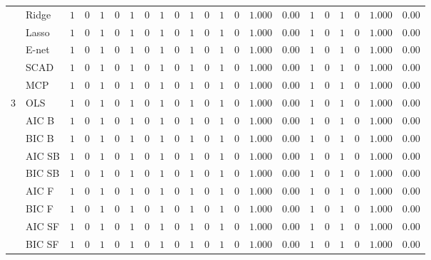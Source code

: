 \begin{tabular}{ll|ll|llllll|llllll|llllll}
 & Ridge  & $1$ & $0$ & $1$ & $0$ & $1$ & $0$ & $1$ & $0$ & $1$ & $0$ & $1$ & $0$ & $1.000$ & $0.00$ & $1$ & $0$ & $1$ & $0$ & $1.000$ & $0.00$ \\
 & Lasso  & $1$ & $0$ & $1$ & $0$ & $1$ & $0$ & $1$ & $0$ & $1$ & $0$ & $1$ & $0$ & $1.000$ & $0.00$ & $1$ & $0$ & $1$ & $0$ & $1.000$ & $0.00$ \\
 & E-net  & $1$ & $0$ & $1$ & $0$ & $1$ & $0$ & $1$ & $0$ & $1$ & $0$ & $1$ & $0$ & $1.000$ & $0.00$ & $1$ & $0$ & $1$ & $0$ & $1.000$ & $0.00$ \\
 & SCAD  & $1$ & $0$ & $1$ & $0$ & $1$ & $0$ & $1$ & $0$ & $1$ & $0$ & $1$ & $0$ & $1.000$ & $0.00$ & $1$ & $0$ & $1$ & $0$ & $1.000$ & $0.00$ \\
 & MCP  & $1$ & $0$ & $1$ & $0$ & $1$ & $0$ & $1$ & $0$ & $1$ & $0$ & $1$ & $0$ & $1.000$ & $0.00$ & $1$ & $0$ & $1$ & $0$ & $1.000$ & $0.00$ \\\hline
3 & OLS  & $1$ & $0$ & $1$ & $0$ & $1$ & $0$ & $1$ & $0$ & $1$ & $0$ & $1$ & $0$ & $1.000$ & $0.00$ & $1$ & $0$ & $1$ & $0$ & $1.000$ & $0.00$ \\
 & AIC B  & $1$ & $0$ & $1$ & $0$ & $1$ & $0$ & $1$ & $0$ & $1$ & $0$ & $1$ & $0$ & $1.000$ & $0.00$ & $1$ & $0$ & $1$ & $0$ & $1.000$ & $0.00$ \\
 & BIC B  & $1$ & $0$ & $1$ & $0$ & $1$ & $0$ & $1$ & $0$ & $1$ & $0$ & $1$ & $0$ & $1.000$ & $0.00$ & $1$ & $0$ & $1$ & $0$ & $1.000$ & $0.00$ \\
 & AIC SB  & $1$ & $0$ & $1$ & $0$ & $1$ & $0$ & $1$ & $0$ & $1$ & $0$ & $1$ & $0$ & $1.000$ & $0.00$ & $1$ & $0$ & $1$ & $0$ & $1.000$ & $0.00$ \\
 & BIC SB  & $1$ & $0$ & $1$ & $0$ & $1$ & $0$ & $1$ & $0$ & $1$ & $0$ & $1$ & $0$ & $1.000$ & $0.00$ & $1$ & $0$ & $1$ & $0$ & $1.000$ & $0.00$ \\
 & AIC F  & $1$ & $0$ & $1$ & $0$ & $1$ & $0$ & $1$ & $0$ & $1$ & $0$ & $1$ & $0$ & $1.000$ & $0.00$ & $1$ & $0$ & $1$ & $0$ & $1.000$ & $0.00$ \\
 & BIC F  & $1$ & $0$ & $1$ & $0$ & $1$ & $0$ & $1$ & $0$ & $1$ & $0$ & $1$ & $0$ & $1.000$ & $0.00$ & $1$ & $0$ & $1$ & $0$ & $1.000$ & $0.00$ \\
 & AIC SF  & $1$ & $0$ & $1$ & $0$ & $1$ & $0$ & $1$ & $0$ & $1$ & $0$ & $1$ & $0$ & $1.000$ & $0.00$ & $1$ & $0$ & $1$ & $0$ & $1.000$ & $0.00$ \\
 & BIC SF  & $1$ & $0$ & $1$ & $0$ & $1$ & $0$ & $1$ & $0$ & $1$ & $0$ & $1$ & $0$ & $1.000$ & $0.00$ & $1$ & $0$ & $1$ & $0$ & $1.000$ & $0.00$ \\

\end{tabular}
